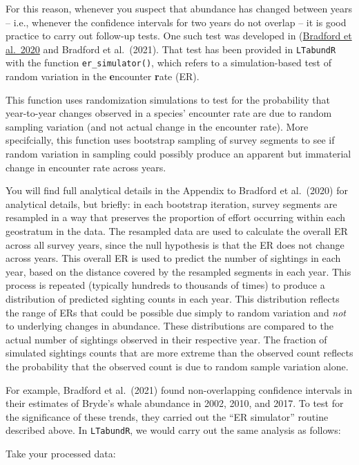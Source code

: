 \documentclass[
]{book}
\begin{document}
For this reason, whenever you suspect that abundance has changed between years -- i.e., whenever the confidence intervals for two years do not overlap -- it is good practice to carry out follow-up tests. One such test was developed in (\href{https://www.fisheries.noaa.gov/inport/item/59592}{Bradford et al.~2020} and Bradford et al.~(2021). That test has been provided in \texttt{LTabundR} with the function \texttt{er\_simulator()}, which refers to a simulation-based test of random variation in the \textbf{e}ncounter \textbf{r}ate (ER).

This function uses randomization simulations to test for the probability that year-to-year changes observed in a species' encounter rate are due to random sampling variation (and not actual change in the encounter rate). More specifcially, this function uses bootstrap sampling of survey segments to see if random variation in sampling could possibly produce an apparent but immaterial change in encounter rate across years.

You will find full analytical details in the Appendix to Bradford et al.~(2020) for analytical details, but briefly: in each bootstrap iteration, survey segments are resampled in a way that preserves the proportion of effort occurring within each geostratum in the data. The resampled data are used to calculate the overall ER across all survey years, since the null hypothesis is that the ER does not change across years. This overall ER is used to predict the number of sightings in each year, based on the distance covered by the resampled segments in each year. This process is repeated (typically hundreds to thousands of times) to produce a distribution of predicted sighting counts in each year. This distribution reflects the range of ERs that could be possible due simply to random variation and \emph{not} to underlying changes in abundance. These distributions are compared to the actual number of sightings observed in their respective year. The fraction of simulated sightings counts that are more extreme than the observed count reflects the probability that the observed count is due to random sample variation alone.

For example, Bradford et al.~(2021) found non-overlapping confidence intervals in their estimates of Bryde's whale abundance in 2002, 2010, and 2017. To test for the significance of these trends, they carried out the ``ER simulator'' routine described above. In \texttt{LTabundR}, we would carry out the same analysis as follows:

Take your processed data:
\end{document}
